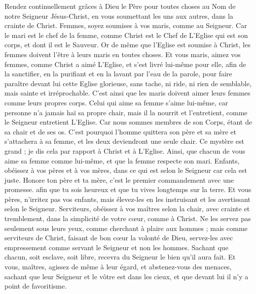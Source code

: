 \begin{multicols}{2}
Rendez continuellement grâces à Dieu le Père pour toutes choses au Nom de notre Seigneur Jésus-Christ,
en vous soumettant les uns aux autres, dans la crainte de Christ.
Femmes, soyez soumises à vos maris, comme au Seigneur.
Car le mari est le chef de la femme, comme Christ est le Chef de L’Eglise qui est son corps, et dont il est le Sauveur.
Or de même que l’Eglise est soumise à Christ, les femmes doivent l’être à leurs maris en toutes choses.
Et vous maris, aimez vos femmes, comme Christ a aimé L’Eglise, et s'est livré lui-même pour elle,
afin de la sanctifier, en la purifiant et en la lavant par l’eau de la parole,
pour faire paraître devant lui cette Eglise glorieuse, sans tache, ni ride, ni rien de semblable, mais sainte et irréprochable.
C’est ainsi que les maris doivent aimer leurs femmes comme leurs propres corps. Celui qui aime sa femme s'aime lui-même,
car personne n'a jamais haï sa propre chair, mais il la nourrit et l'entretient, comme le Seigneur entretient L’Eglise.
Car nous sommes membres de son Corps, étant de sa chair et de ses os.
C'est pourquoi l'homme quittera son père et sa mère et s’attachera à sa femme, et les deux deviendront une seule chair.
Ce mystère est grand ; je dis cela par rapport à Christ et à L’Eglise.
Ainsi, que chacun de vous aime sa femme comme lui-même, et que la femme respecte son mari.
\VerseOne{}Enfants, obéissez à vos pères et à vos mères, dans ce qui est selon le Seigneur car cela est juste.
Honore ton père et ta mère, c’est le premier commandement avec une promesse.
afin que tu sois heureux et que tu vives longtemps sur la terre.
Et vous pères, n'irritez pas vos enfants, mais élevez-les en les instruisant et les avertissant selon le Seigneur.
Serviteurs, obéissez à vos maîtres selon la chair, avec crainte et tremblement, dans la simplicité de votre cœur, comme à Christ.
Ne les servez pas seulement sous leurs yeux, comme cherchant à plaire aux hommes ; mais comme serviteurs de Christ, faisant de bon cœur la volonté de Dieu,
servez-les avec empressement comme servant le Seigneur et non les hommes.
Sachant que chacun, soit esclave, soit libre, recevra du Seigneur le bien qu'il aura fait.
Et vous, maîtres, agissez de même à leur égard, et abstenez-vous des menaces, sachant que leur Seigneur et le vôtre est dans les cieux, et que devant lui il n'y a point de favoritisme.

\end{multicols}
